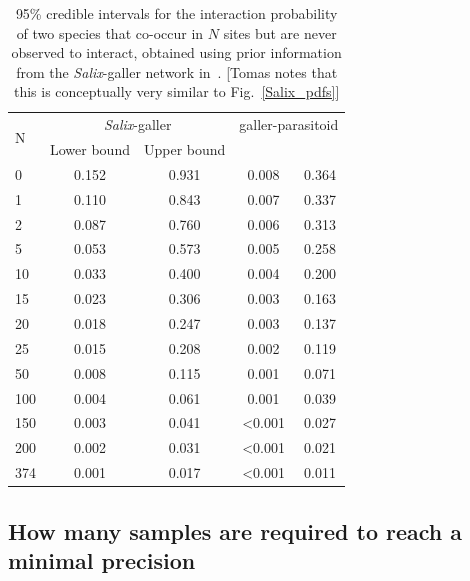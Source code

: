 \documentclass[12pt]{article}
\begin{document}
      \begin{table}[h]
        \caption{95\% credible intervals for the interaction probability of two species that co-occur in $N$ sites but are never observed to interact, obtained using prior information from the \emph{Salix}-galler network in~\citet{Barbour2016,Barbour2016Dryad}. [Tomas notes that this is conceptually very similar to Fig.~\ref{Salix_pdfs}]}
        \label{interval_table}
        \begin{tabular}{l | c c | c c }
        \multirow{2}{*}{N} & \multicolumn{2}{c}{\emph{Salix}-galler} & \multicolumn{2}{c}{galler-parasitoid}\\
         & Lower bound & Upper bound \\
        \hline
        0   & 0.152 & 0.931 & 0.008 & 0.364 \\
        1   & 0.110 & 0.843 & 0.007 & 0.337 \\
        2   & 0.087 & 0.760 & 0.006 & 0.313 \\
        5   & 0.053 & 0.573 & 0.005 & 0.258 \\
        10  & 0.033 & 0.400 & 0.004 & 0.200 \\
        15  & 0.023 & 0.306 & 0.003 & 0.163 \\
        20  & 0.018 & 0.247 & 0.003 & 0.137 \\
        25  & 0.015 & 0.208 & 0.002 & 0.119 \\
        50  & 0.008 & 0.115 & 0.001 & 0.071 \\
        100 & 0.004 & 0.061 & 0.001 & 0.039 \\
        150 & 0.003 & 0.041 & \textless0.001 & 0.027 \\
        200 & 0.002 & 0.031 & \textless0.001 & 0.021 \\
        \hline
        374 & 0.001 & 0.017 & \textless0.001 & 0.011 \\
        \hline
        \end{tabular}
        \end{table}


  \subsection*{How many samples are required to reach a minimal precision}
\end{document}

